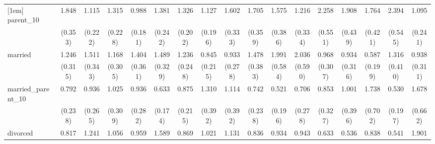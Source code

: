 {\begin{tabular}{l*{16}{c}}
[1em]
parent\_10           &       1.848\sym{**} &       1.115         &       1.315         &       0.988         &       1.381         &       1.326         &       1.127         &       1.602\sym{*}  &       1.705\sym{*}  &       1.575         &       1.216         &       2.258\sym{***}&       1.908\sym{**} &       1.764\sym{*}  &       2.394\sym{***}&       1.095         \\
                    &     (0.353)         &     (0.222)         &     (0.228)         &     (0.181)         &     (0.242)         &     (0.202)         &     (0.196)         &     (0.333)         &     (0.359)         &     (0.386)         &     (0.334)         &     (0.551)         &     (0.439)         &     (0.421)         &     (0.545)         &     (0.241)         \\
[1em]
married             &       1.246         &       1.511         &       1.168         &       1.404         &       1.489         &       1.236         &       0.845         &       0.933         &       1.478         &       1.991\sym{*}  &       2.036\sym{*}  &       0.968         &       0.934         &       0.587         &       1.316         &       0.938         \\
                    &     (0.315)         &     (0.343)         &     (0.305)         &     (0.361)         &     (0.329)         &     (0.248)         &     (0.215)         &     (0.278)         &     (0.383)         &     (0.584)         &     (0.590)         &     (0.307)         &     (0.316)         &     (0.199)         &     (0.410)         &     (0.311)         \\
[1em]
married\_parent\_10   &       0.792         &       0.936         &       1.025         &       0.936         &       0.633         &       0.875         &       1.310         &       1.114         &       0.742         &       0.521         &       0.706         &       0.853         &       1.001         &       1.738         &       0.530         &       1.678         \\
                    &     (0.238)         &     (0.265)         &     (0.309)         &     (0.282)         &     (0.174)         &     (0.215)         &     (0.392)         &     (0.392)         &     (0.238)         &     (0.196)         &     (0.278)         &     (0.327)         &     (0.396)         &     (0.702)         &     (0.197)         &     (0.662)         \\
[1em]
divorced            &       0.817         &       1.241         &       1.056         &       0.959         &       1.589         &       0.869         &       1.021         &       1.131         &       0.836         &       0.934         &       0.943         &       0.633         &       0.536         &       0.838         &       0.541         &       1.901         \\

\end{tabular}}
